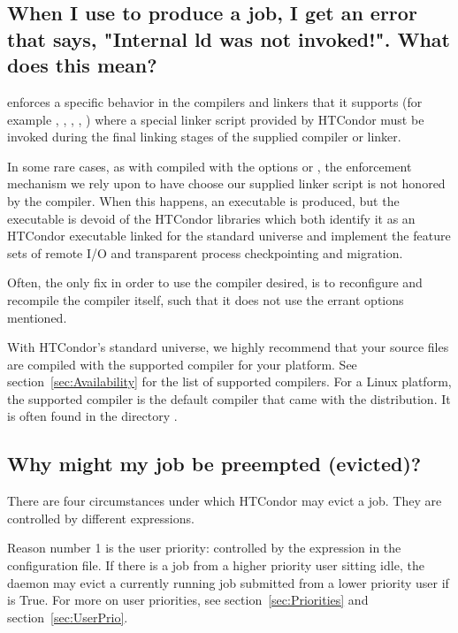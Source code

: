 \subsection*{When I use  to produce a job, I get an error that says, "Internal ld was not invoked!". What does this mean?}

 enforces a specific behavior in the compilers and
linkers that it supports
(for example , , , , )
where a special linker script
provided by HTCondor must be invoked during the final linking stages of
the supplied compiler or linker.

In some rare cases,
as with  compiled with
the options  or ,
the enforcement mechanism
we rely upon to have 
choose our supplied linker script is not honored
by the compiler.
When this happens, an executable is produced,
but the executable is devoid of the
HTCondor libraries which both identify it as an HTCondor executable linked
for the standard universe and implement the feature sets of remote I/O
and transparent process checkpointing and migration.

Often, the only fix in order to use the compiler desired,
is to reconfigure and recompile the compiler itself,
such that it does not use the errant options mentioned. 

With HTCondor's standard universe,
we highly recommend that your source files
are compiled with the supported compiler for your platform.
See
section~\ref{sec:Availability}
for the list of supported compilers.
For a Linux platform, the supported compiler
is the default compiler that came with the distribution.
It is often found in the directory .

\subsection*{Why might my job be preempted (evicted)?}

There are four circumstances under which HTCondor may evict a job.
They are controlled by different expressions.

Reason number 1 is the user priority:
controlled by the 
expression in the configuration file.
If there is a job from a 
higher priority user sitting idle,
the  daemon may evict 
a currently running job submitted from a lower priority user if 
 is True.
For more on user priorities,
see section~\ref{sec:Priorities} and
section~\ref{sec:UserPrio}.

